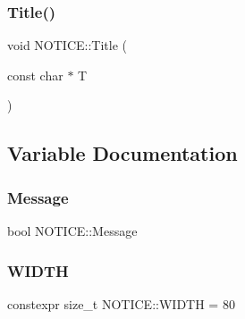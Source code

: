 \subsubsection{\texorpdfstring{Title()}{Title()}}
{\footnotesize\ttfamily void N\+O\+T\+I\+C\+E\+::\+Title (\begin{DoxyParamCaption}\item[{const char $\ast$}]{T }\end{DoxyParamCaption})\hspace{0.3cm}{\ttfamily [inline]}}



\subsection{Variable Documentation}
\mbox{\label{namespace_n_o_t_i_c_e_a4de9d52506c4de1641e95f4f53669e3f}} 
\subsubsection{\texorpdfstring{Message}{Message}}
{\footnotesize\ttfamily bool N\+O\+T\+I\+C\+E\+::\+Message}

\mbox{\label{namespace_n_o_t_i_c_e_a31f6fb221f22faf96b9cfb05315d1d3e}} 
\subsubsection{\texorpdfstring{W\+I\+D\+TH}{WIDTH}}
{\footnotesize\ttfamily constexpr size\+\_\+t N\+O\+T\+I\+C\+E\+::\+W\+I\+D\+TH = 80}

